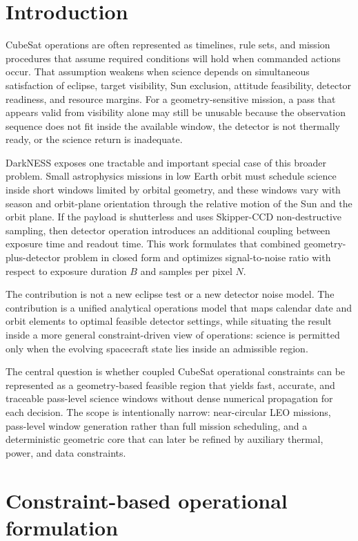 \documentclass[preprint,12pt]{elsarticle}
\theoremstyle{definition}
\theoremstyle{remark}
\begin{document}
\section{Introduction}

CubeSat operations are often represented as timelines, rule sets, and mission procedures that assume required conditions will hold when commanded actions occur.
That assumption weakens when science depends on simultaneous satisfaction of eclipse, target visibility, Sun exclusion, attitude feasibility, detector readiness, and resource margins.
For a geometry-sensitive mission, a pass that appears valid from visibility alone may still be unusable because the observation sequence does not fit inside the available window, the detector is not thermally ready, or the science return is inadequate.

DarkNESS exposes one tractable and important special case of this broader problem.
Small astrophysics missions in low Earth orbit must schedule science inside short windows limited by orbital geometry, and these windows vary with season and orbit-plane orientation through the relative motion of the Sun and the orbit plane.
If the payload is shutterless and uses Skipper-CCD non-destructive sampling, then detector operation introduces an additional coupling between exposure time and readout time.
This work formulates that combined geometry-plus-detector problem in closed form and optimizes signal-to-noise ratio with respect to exposure duration $B$ and samples per pixel $N$.

The contribution is not a new eclipse test or a new detector noise model.
The contribution is a unified analytical operations model that maps calendar date and orbit elements to optimal feasible detector settings, while situating the result inside a more general constraint-driven view of operations: science is permitted only when the evolving spacecraft state lies inside an admissible region.

The central question is whether coupled CubeSat operational constraints can be represented as a geometry-based feasible region that yields fast, accurate, and traceable pass-level science windows without dense numerical propagation for each decision.
The scope is intentionally narrow: near-circular LEO missions, pass-level window generation rather than full mission scheduling, and a deterministic geometric core that can later be refined by auxiliary thermal, power, and data constraints.

\section{Constraint-based operational formulation}
\label{sec:framework}
\end{document}
